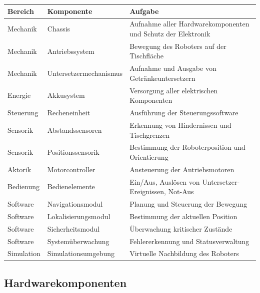 \documentclass[
  a4paper,
  12pt,
  DIV=12,        %
  parskip=half,  %
  headings=small %
]{scrartcl}
\theoremstyle{definition}
\theoremstyle{definition}
\begin{document}
\begin{longtable}[]{@{}
  >{\raggedright\arraybackslash}p{}
  >{\raggedright\arraybackslash}p{}
  >{\raggedright\arraybackslash}p{}@{}}
\toprule\noalign{}
\begin{minipage}[b]{\linewidth}\raggedright
Bereich
\end{minipage} & \begin{minipage}[b]{\linewidth}\raggedright
Komponente
\end{minipage} & \begin{minipage}[b]{\linewidth}\raggedright
Aufgabe
\end{minipage} \\
\midrule\noalign{}
\endhead
\bottomrule\noalign{}
\endlastfoot
Mechanik & Chassis & Aufnahme aller Hardwarekomponenten und Schutz der
Elektronik \\
Mechanik & Antriebssystem & Bewegung des Roboters auf der Tischfläche \\
Mechanik & Untersetzermechanismus & Aufnahme und Ausgabe von
Getränkeuntersetzern \\
Energie & Akkusystem & Versorgung aller elektrischen Komponenten \\
Steuerung & Recheneinheit & Ausführung der Steuerungssoftware \\
Sensorik & Abstandssensoren & Erkennung von Hindernissen und
Tischgrenzen \\
Sensorik & Positionssensorik & Bestimmung der Roboterposition und
Orientierung \\
Aktorik & Motorcontroller & Ansteuerung der Antriebsmotoren \\
Bedienung & Bedienelemente & Ein/Aus, Auslösen von
Untersetzer-Ereignissen, Not-Aus \\
Software & Navigationsmodul & Planung und Steuerung der Bewegung \\
Software & Lokalisierungsmodul & Bestimmung der aktuellen Position \\
Software & Sicherheitsmodul & Überwachung kritischer Zustände \\
Software & Systemüberwachung & Fehlererkennung und Statusverwaltung \\
Simulation & Simulationsumgebung & Virtuelle Nachbildung des Roboters \\
\end{longtable}

\subsection{Hardwarekomponenten}\label{hardwarekomponenten}
\end{document}
